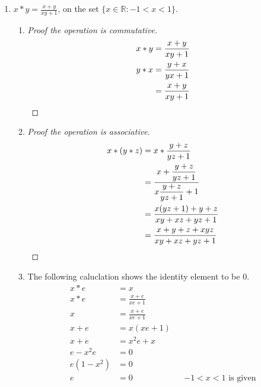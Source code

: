 \documentclass[draft,twoside]{amsart}
\newcommand{\Reals}{\mathbb{R}{}}
\begin{document}
\begin{enumerate}
\begin{enumerate}
         \item The following calculation shows the inverse of $x$ is 
	 $\displaystyle \frac{-x}{1+x}$.
	 \begin{align*}
	    x * x' & = 0            \\
	    x * x' & = x + x' + xx' \\
	         0 & = x + x' + xx' \\
		 0 & = x + x'(1 + x) \\
		-x & = x'(1+x) \\
	    x'(1+x)& = -x \\
	        x' & = \frac{-x}{1+x} && \text{$x\ne-1$ given}
	 \end{align*}

      \end{enumerate}

      \item $x * y = \displaystyle \frac{x + y}{xy + 1}$, on the set
      $\{x \in \Reals : -1 < x < 1\}$.
      \begin{enumerate}
	 \item
         \begin{proof}[Proof the operation is commutative]
	    \begin{align*}
	       x * y & = \frac{x+y}{xy + 1} \\
	       y * x & = \frac{y+x}{yx + 1} \\
	             & = \frac{x+y}{xy + 1} \qedhere
	    \end{align*}
	 \end{proof}

	 \item
	 \begin{proof}[Proof the operation is associative]
	    \begin{align*}
	       x * (y * z) & = x * \frac{y + z}{yz + 1} \\
	                   & = \frac{x + \displaystyle \frac{y + z}{yz + 1}}
			       {x\displaystyle \frac{y + z}{yz + 1} + 1} \\
			   & = \frac{x(yz+1)+y+z}{xy+xz+yz+1} \\
			   & = \frac{x + y + z + xyz}{xy + xz + yz + 1}
			       \qedhere
	    \end{align*}
	 \end{proof}

	 \item The following caluclation shows the identity element to be 0.
	 \begin{align*}
	    x * e & = x \\
	    x * e & = \frac{x + e}{xe + 1} \\
	        x & = \frac{x + e}{xe + 1} \\
            x + e & = x(xe + 1) \\
	    x + e & = x^2e + x \\
	    e - x^2e & = 0  \\
	    e(1-x^2) & = 0    \\
	        e & = 0  && \text{$-1 < x < 1$ is given}
	 \end{align*}


\end{enumerate}
\end{enumerate}
\end{document}
